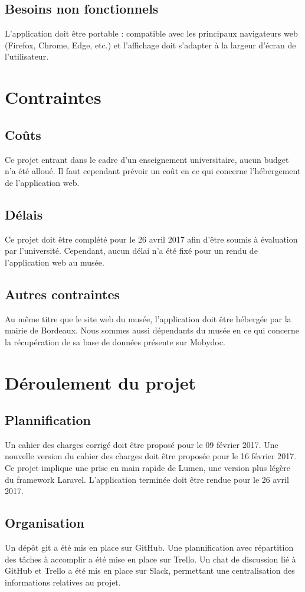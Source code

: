 \documentclass[a4paper]{article}
\begin{document}
\subsection{Besoins non fonctionnels}
L'application doit être portable : compatible avec les principaux navigateurs web (Firefox, Chrome, Edge, etc.) et l'affichage doit s'adapter à la largeur d'écran de l'utilisateur.\\

\section{Contraintes}
\subsection{Coûts}
Ce projet entrant dans le cadre d'un enseignement universitaire, aucun budget n'a été alloué. Il faut cependant prévoir un coût en ce qui concerne l'hébergement de l'application web.
\subsection{Délais}
Ce projet doit être complété pour le 26 avril 2017 afin d'être soumis à évaluation par l'université. Cependant, aucun délai n'a été fixé pour un rendu de l'application web au musée.
\subsection{Autres contraintes}
Au même titre que le site web du musée, l’application doit être hébergée par la mairie de Bordeaux. Nous sommes aussi dépendants du musée en ce qui concerne la récupération de sa base de données présente sur Mobydoc.

\section{Déroulement du projet}
\subsection{Plannification}
Un cahier des charges corrigé doit être proposé pour le 09 février 2017. Une nouvelle version du cahier des charges doit être proposée pour le 16 février 2017. Ce projet implique une prise en main rapide de Lumen, une version plus légère du framework Laravel. L'application terminée doit être rendue pour le 26 avril 2017.
\subsection{Organisation}
Un dépôt git a été mis en place sur GitHub. Une plannification avec répartition des tâches à accomplir a été mise en place sur Trello. Un chat de discussion lié à GitHub et Trello a été mis en place sur Slack, permettant une centralisation des informations relatives au projet.
\end{document}
